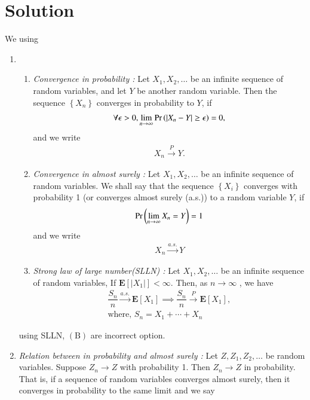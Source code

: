 \documentclass[journal,12pt,twocolumn]{IEEEtran}
\begin{document}
\section{Solution}
We using
\begin{enumerate}[label=\alph*)]
\item 
\begin{enumerate}[label=(\arabic*)]
\item {\em Convergence in probability : }Let $X_{1}, X_{2}, \ldots$ be an infinite sequence of random variables, and let $Y$ be another random variable. Then the sequence $\left\{X_{n}\right\}$ converges in probability to $Y$, if
\begin{align}
\forall \epsilon>0, \lim _{n \rightarrow \infty} \Pr\left(\left|X_{n}-Y\right| \geq \epsilon\right)=0,
\end{align}
and we write 
\begin{align}
X_{n} \stackrel{P}{\rightarrow} Y.
\end{align}
\item {\em Convergence in almost surely : }Let $X_{1}, X_{2}, \ldots$ be an infinite sequence of random variables. We shall say that the sequence $\left\{X_{i}\right\}$ converges with probability 1 (or converges almost surely (a.s.)) to a random variable $Y$, if 
\begin{align}
\Pr\left(\lim _{n \rightarrow \infty} X_{n}=Y\right)=1
\end{align}
and we write
\begin{align}
X_{n} \stackrel{a . s .}{\rightarrow} Y
\end{align}
\item {\em Strong law of large number(SLLN) : }Let $X_{1}, X_{2}, \ldots$ be an infinite sequence of random variables, If $\mathbf{E}\left[\left|X_{1}\right|\right]<\infty$. Then, as $n \rightarrow \infty$ , we have 
\begin{align}
\dfrac{S_{n}}{n} \stackrel{a.s.}{\rightarrow} \mathbf{E}\left[X_{1}\right]\implies \dfrac{S_{n}}{n} \stackrel{P}{\rightarrow} \mathbf{E}\left[X_{1}\right],\\
\text{where} ,\,S_n = X_1 + \cdots + X_n
\end{align}  
\end{enumerate}
using SLLN, $(\mathrm{B})$ are incorrect option.
\item {\em Relation between in probability and almost surely : }Let $Z, Z_{1}, Z_{2}, \ldots$ be random variables. Suppose $Z_{n} \rightarrow Z$ with probability 1. Then $Z_{n} \rightarrow Z$ in probability. That is, if a sequence of random variables converges almost surely, then it converges in probability to the same limit and we say 

\end{enumerate}
\end{document}
